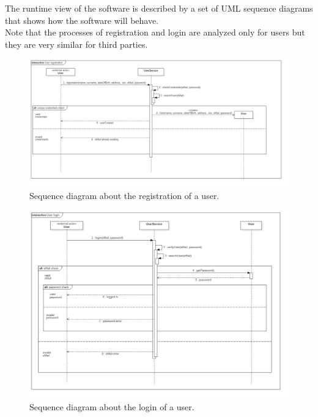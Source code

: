 The runtime view of the software is described by a set of UML sequence diagrams that shows how the software will behave.\\
Note that the processes of registration and login are analyzed only for users but they are very similar for third parties.

\begin{figure}[h!]
	\includegraphics[width=1.0\textwidth]{./pictures/sequence_userRegistration.png}\par
	\caption{Sequence diagram about the registration of a user.}
\end{figure}
\FloatBarrier 

\begin{figure}[h!]
	\includegraphics[width=1.0\textwidth]{./pictures/sequence_userLogin.png}\par
	\caption{Sequence diagram about the login of a user.}
\end{figure}
\FloatBarrier 

